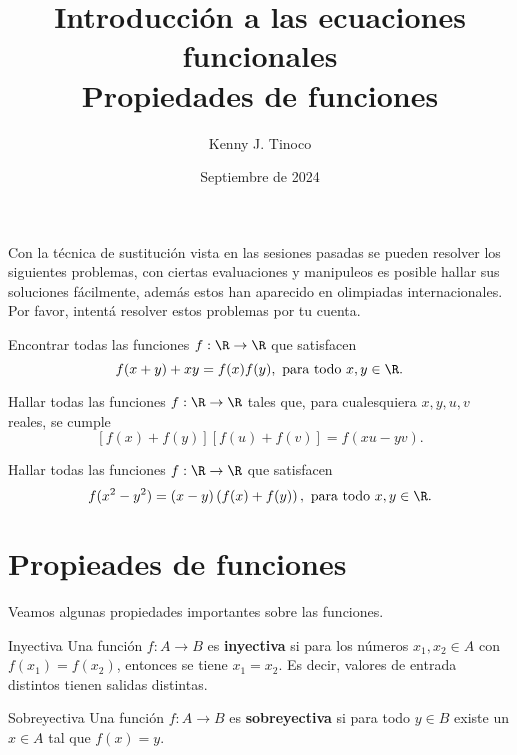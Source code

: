 \documentclass[12pt]{article}
\title{Introducción a las ecuaciones funcionales\\Propiedades de funciones}
\author{Kenny J. Tinoco}
\date{Septiembre de 2024}
\begin{document}
   \maketitle
   Con la técnica de sustitución vista en las sesiones pasadas se pueden resolver los siguientes problemas, con ciertas
   evaluaciones y manipuleos es posible hallar sus soluciones fácilmente, además estos han aparecido en olimpiadas internacionales.
   Por favor, intentá resolver estos problemas por tu cuenta.

   \begin{prob-without-section}[India, 2010]
      Encontrar todas las funciones $f: \R \to \R$ que satisfacen
      \[
         f(x + y) + xy = f(x)f(y),\ \text{para todo}\ x,y \in \R.
      \]
   \end{prob-without-section}

   \begin{prob-without-section}[IMO, 2002]
      Hallar todas las funciones $f: \R \to \R$ tales que, para cualesquiera $x,y,u,v$ reales, se cumple
      \[
         \left[f(x) + f(y)\right]\left[f(u) + f(v)\right] = f(xu - yv).
      \]
   \end{prob-without-section}

   \begin{prob-without-section}[Korea, 2000]
      Hallar todas las funciones $f : \R \to \R$ que satisfacen
      \[
         f(x^2 - y^2) = (x - y)\left(f(x) + f(y)\right),\ \text{para todo}\ x,y \in \R.
      \]
   \end{prob-without-section}

   \section{Propieades de funciones}

   Veamos algunas propiedades importantes sobre las funciones.
   \begin{definition.box}{Inyectiva}{}
      Una función $f : A \to B$ es \textbf{inyectiva} si para los números $x_1, x_2 \in A$ con $f(x_1) = f(x_2)$, entonces se tiene $x_1 = x_2$.
      Es decir, valores de entrada distintos tienen salidas distintas.
   \end{definition.box}

   \begin{definition.box}{Sobreyectiva}{}
      Una función $f : A \to B$ es \textbf{sobreyectiva} si para todo $y \in B$ existe un $x \in A$ tal que $f(x) = y$.
   \end{definition.box}
\end{document}
